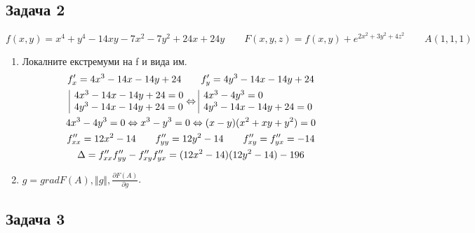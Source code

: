 \documentclass[a4paper,fleqn,12pt]{article}
\theoremstyle{definition}
\begin{document}
\subsection*{Задача 2}
$$f(x,y) = x^4 + y^4 - 14xy - 7x^2 - 7y^2 + 24x + 24y \qquad F(x,y,z) = f(x,y) + e^{2x^2 + 3y^2 + 4z^2} \qquad A(1,1,1)$$
\begin{enumerate}
\item Локалните екстремуми на f и вида им. 
\begin{gather*}
f'_x = 4x^3 - 14x - 14y + 24  \qquad f'_y = 4y^3 - 14x - 14y + 24 \\
\begin{array}{|l@{}}
4x^3 - 14x - 14y + 24 = 0 \\
4y^3 - 14x - 14y + 24 = 0 
\end{array}\Leftrightarrow
\begin{array}{|l@{}}
4x^3 - 4y^3 = 0 \\
4y^3 - 14x - 14y + 24 = 0 
\end{array}\\
4x^3 - 4y^3 = 0 \Leftrightarrow x^3 - y^3 = 0 \Leftrightarrow (x-y)(x^2+xy+y^2) = 0 \\
f''_{xx} = 12x^2 - 14 \qquad f''_{yy} = 12y^2 - 14 \qquad f''_{xy} = f''_{yx} = -14 \\
\Delta = f''_{xx}f''_{yy} - f''_{xy}f''_{yx} = (12x^2 - 14)(12y^2 - 14) - 196 \\
\end{gather*}
\item $g = grad F(A), \Vert g \Vert, \frac{\partial F(A)}{\partial g}$.
\end{enumerate}
\subsection*{Задача 3}
\end{document}
